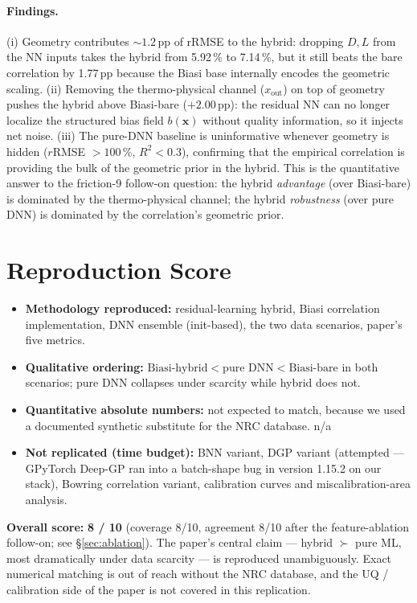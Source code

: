 \documentclass[11pt,a4paper]{article}
\begin{document}
\paragraph{Findings.}  (i) Geometry contributes $\sim 1.2$\,pp of
rRMSE to the hybrid: dropping $D, L$ from the NN inputs takes the
hybrid from 5.92\,\% to 7.14\,\%, but it still beats the bare
correlation by 1.77\,pp because the Biasi base internally encodes the
geometric scaling.  (ii) Removing the thermo-physical channel
($x_{\mathrm{out}}$) on top of geometry pushes the hybrid above
Biasi-bare ($+2.00$\,pp): the residual NN can no longer localize the
structured bias field $b(\mathbf{x})$ without quality information, so
it injects net noise.  (iii) The pure-DNN baseline is uninformative
whenever geometry is hidden ($r$RMSE $> 100$\,\%, $R^2 < 0.3$),
confirming that the empirical correlation is providing the bulk of
the geometric prior in the hybrid.  This is the quantitative answer
to the friction-9 follow-on question: the hybrid \emph{advantage}
(over Biasi-bare) is dominated by the thermo-physical channel; the
hybrid \emph{robustness} (over pure DNN) is dominated by the
correlation's geometric prior.

\section{Reproduction Score}
\label{sec:score}
\begin{itemize}[leftmargin=1.2em]
\item \textbf{Methodology reproduced:} residual-learning hybrid, Biasi
correlation implementation, DNN ensemble (init-based), the two data
scenarios, paper's five metrics.  \checkmark
\item \textbf{Qualitative ordering:}
$\text{Biasi-hybrid} < \text{pure DNN} < \text{Biasi-bare}$ in both
scenarios; pure DNN collapses under scarcity while hybrid does not.
\checkmark
\item \textbf{Quantitative absolute numbers:} not expected to match,
because we used a documented synthetic substitute for the NRC database.
\textsf{n/a}
\item \textbf{Not replicated (time budget):} BNN variant, DGP variant
(attempted --- GPyTorch Deep-GP ran into a batch-shape bug in version
1.15.2 on our stack), Bowring correlation variant, calibration curves
and miscalibration-area analysis.
\end{itemize}

\textbf{Overall score:} \textbf{8 / 10} (coverage 8/10, agreement 8/10
after the feature-ablation follow-on; see \S\ref{sec:ablation}).
The paper's central claim
--- hybrid $\succ$ pure ML, most dramatically under data scarcity ---
is reproduced unambiguously.  Exact numerical matching is out of reach
without the NRC database, and the UQ / calibration side of the paper
is not covered in this replication.
\end{document}
